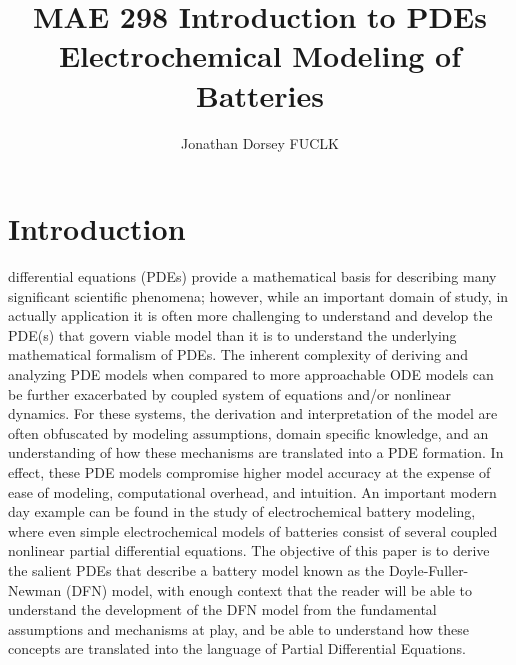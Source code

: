 \documentclass[lettersize,journal]{IEEEtran}
\begin{document}
\title{MAE 298 Introduction to PDEs \\ Electrochemical Modeling of Batteries}

\author{Jonathan Dorsey  FUCLK}



\maketitle


\section{Introduction}
 differential equations (PDEs) provide a mathematical basis for describing many significant scientific phenomena; however, while an important domain of study, in actually application it is often more challenging to understand and develop the PDE(s) that govern viable model than it is to understand the underlying mathematical formalism of PDEs. The inherent complexity of deriving and analyzing PDE models when compared to more approachable ODE models can be further exacerbated by coupled system of equations and/or nonlinear dynamics. For these systems, the derivation and interpretation of the model are often obfuscated by modeling assumptions, domain specific knowledge, and an understanding of how these mechanisms are translated into a PDE formation. In effect, these PDE models compromise higher model accuracy at the expense of ease of modeling, computational overhead, and intuition. An important modern day example can be found in the study of electrochemical battery modeling, where even simple electrochemical models of batteries consist of several coupled nonlinear partial differential equations. The objective of this paper is to derive the salient PDEs that describe a battery model known as the Doyle-Fuller-Newman (DFN) model, with enough context that the reader will be able to understand the development of the DFN model from the fundamental assumptions and mechanisms at play, and be able to understand how these concepts are translated into the language of Partial Differential Equations.
\end{document}

